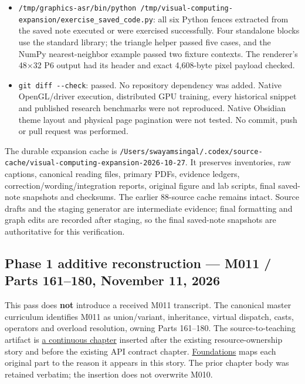 \begin{itemize}
\item
  \texttt{/tmp/graphics-asr/bin/python\ /tmp/visual-computing-expansion/exercise\_saved\_code.py}: all six Python fences extracted from the saved note executed or were exercised successfully. Four standalone blocks use the standard library; the triangle helper passed five cases, and the NumPy nearest-neighbor example passed two fixture contexts. The renderer's 48×32 P6 output had its header and exact 4,608-byte pixel payload checked.
\item
  \texttt{git\ diff\ -\/-check}: passed. No repository dependency was added. Native OpenGL/driver execution, distributed GPU training, every historical snippet and published research benchmarks were not reproduced. Native Obsidian theme layout and physical page pagination were not tested. No commit, push or pull request was performed.
\end{itemize}

The durable expansion cache is \texttt{/Users/swayamsingal/.codex/source-cache/visual-computing-expansion-2026-10-27}. It preserves inventories, raw captions, canonical reading files, primary PDFs, evidence ledgers, correction/wording/integration reports, original figure and lab scripts, final saved-note snapshots and checksums. The earlier 88-source cache remains intact. Source drafts and the staging generator are intermediate evidence; final formatting and graph edits are recorded after staging, so the final saved-note snapshots are authoritative for this verification.

\subsection{Phase 1 additive reconstruction --- M011 / Parts 161--180, November 11, 2026}\label{appendix-a103e7846d21-phase-1-additive-reconstruction-m011-parts-161180-november-11-2026}

This pass does \textbf{not} introduce a received M011 transcript. The canonical master curriculum identifies M011 as union/variant, inheritance, virtual dispatch, casts, operators and overload resolution, owning Parts 161--180. The source-to-teaching artifact is \hyperref[01-foundations-i-ch004-from-one-owned-resource-to-many-requests-and-a-replaceable-backend]{a continuous chapter} inserted after the existing resource-ownership story and before the existing API contract chapter. \hyperref[appendix-fd090d982a15-m011-parts-161180-a-request-changes-shape-and-a-backend-changes-implementation]{Foundations} maps each original part to the reason it appears in this story. The prior chapter body was retained verbatim; the insertion does not overwrite M010.

